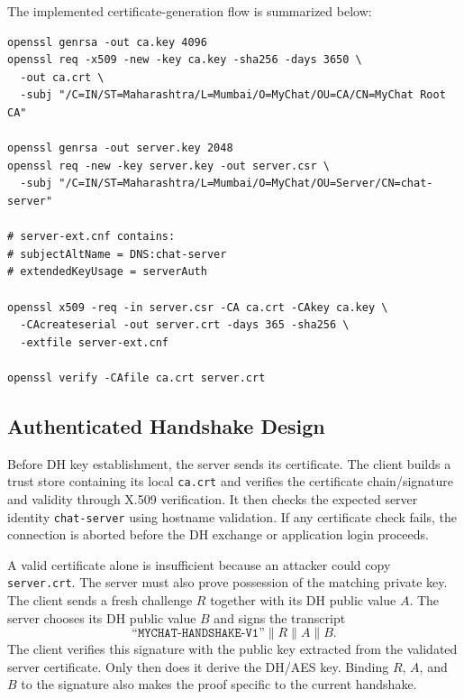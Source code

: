 \documentclass[11pt]{article}
\begin{document}
The implemented certificate-generation flow is summarized below:

\begin{lstlisting}[basicstyle=\ttfamily\small,breaklines=true]
openssl genrsa -out ca.key 4096
openssl req -x509 -new -key ca.key -sha256 -days 3650 \
  -out ca.crt \
  -subj "/C=IN/ST=Maharashtra/L=Mumbai/O=MyChat/OU=CA/CN=MyChat Root CA"

openssl genrsa -out server.key 2048
openssl req -new -key server.key -out server.csr \
  -subj "/C=IN/ST=Maharashtra/L=Mumbai/O=MyChat/OU=Server/CN=chat-server"

# server-ext.cnf contains:
# subjectAltName = DNS:chat-server
# extendedKeyUsage = serverAuth

openssl x509 -req -in server.csr -CA ca.crt -CAkey ca.key \
  -CAcreateserial -out server.crt -days 365 -sha256 \
  -extfile server-ext.cnf

openssl verify -CAfile ca.crt server.crt
\end{lstlisting}

\subsection{Authenticated Handshake Design}

Before DH key establishment, the server sends its certificate. The client builds a trust store containing its local \texttt{ca.crt} and verifies the certificate chain/signature and validity through X.509 verification. It then checks the expected server identity \texttt{chat-server} using hostname validation. If any certificate check fails, the connection is aborted before the DH exchange or application login proceeds.

A valid certificate alone is insufficient because an attacker could copy \texttt{server.crt}. The server must also prove possession of the matching private key. The client sends a fresh challenge $R$ together with its DH public value $A$. The server chooses its DH public value $B$ and signs the transcript
\[
\texttt{``MYCHAT-HANDSHAKE-V1''} \parallel R \parallel A \parallel B.
\]
The client verifies this signature with the public key extracted from the validated server certificate. Only then does it derive the DH/AES key. Binding $R$, $A$, and $B$ to the signature also makes the proof specific to the current handshake.
\end{document}
